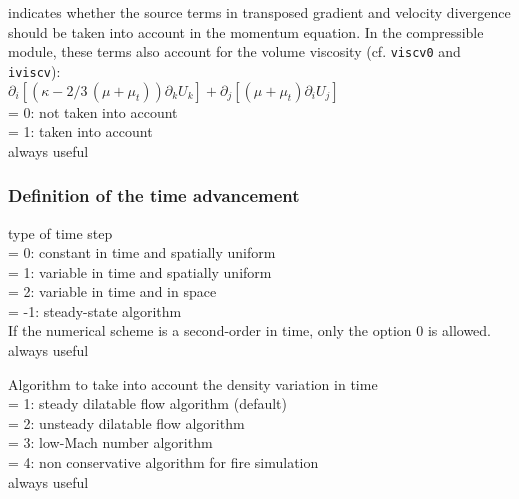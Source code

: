 {indicates whether the source terms in transposed gradient
and velocity divergence should be taken into account in the momentum
equation. In the compressible module, these terms also account for the volume
viscosity (cf. {\tt viscv0} and {\tt iviscv}):\\
$\partial_i \left[(\kappa -2/3\,(\mu+\mu_t))\partial_k U_k  \right]
 +     \partial_j \left[ (\mu+\mu_t)\partial_i U_j \right]$ \\
\hspace*{1.3cm}= 0: not taken into account\\
\hspace*{1.3cm}= 1: taken into account\\
always useful}


\subsubsection{Definition of the time advancement}

{type of time step\\
\hspace*{1.3cm}= 0: constant in time and spatially uniform\\
\hspace*{1.3cm}= 1: variable in time and spatially uniform\\
\hspace*{1.3cm}= 2: variable in time and in space\\
\hspace*{1.3cm}= -1: steady-state algorithm\\
If the numerical scheme is a second-order in time, only the option 0 is
allowed.\\
always useful}

{Algorithm to take into account the density variation in time\\
\hspace*{1.3cm}= 1: steady dilatable flow algorithm (default)\\
\hspace*{1.3cm}= 2: unsteady dilatable flow algorithm\\
\hspace*{1.3cm}= 3: low-Mach number algorithm\\
\hspace*{1.3cm}= 4: non conservative algorithm for fire simulation\\
always useful}

